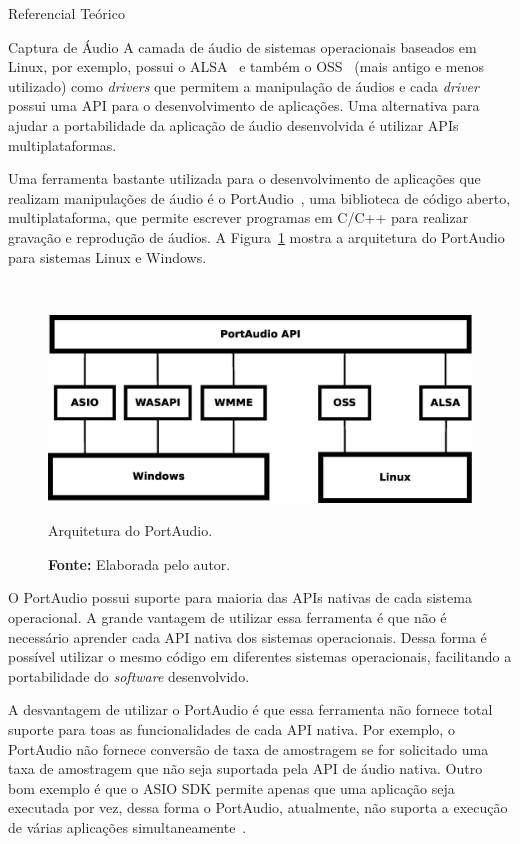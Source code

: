 \begin{chapter}{Referencial Teórico}
\begin{section}{Captura de Áudio}
A camada de áudio de sistemas operacionais baseados em Linux, por
exemplo, possui o ALSA~\cite{alsa} e também o OSS~\cite{oss} (mais antigo e
menos utilizado) como
\textit{drivers} que permitem a manipulação de áudios e cada \textit{driver}
possui uma API para o desenvolvimento de aplicações. Uma alternativa para ajudar
a portabilidade da aplicação de áudio desenvolvida é utilizar APIs
multiplataformas.

Uma ferramenta bastante utilizada para o desenvolvimento de aplicações que
realizam manipulações de áudio é o PortAudio~\cite{portaudio}, uma biblioteca de
código aberto, multiplataforma, que permite escrever programas em C/C++ para
realizar gravação e reprodução de áudios. A Figura~\ref{fig:portaudio} mostra a
arquitetura do PortAudio para sistemas Linux e Windows.

~

\begin{figure}[!h]
	\centering
	\begin{minipage}[c]{\textwidth}
	\centering
	\includegraphics[width=0.75\linewidth]{fig/portaudio}
	\caption{Arquitetura do PortAudio.}
	\vspace{-1cm}
	\caption*{\textbf{Fonte: }Elaborada pelo autor.}
	\label{fig:portaudio}
	\end{minipage}
\end{figure} 

O PortAudio possui suporte para maioria das APIs nativas de cada sistema
operacional. A grande vantagem de utilizar essa ferramenta é que não é
necessário aprender cada API nativa dos sistemas operacionais. Dessa forma é
possível utilizar o mesmo código em diferentes sistemas operacionais,
facilitando a portabilidade do \textit{software} desenvolvido.

A desvantagem de utilizar o PortAudio é que essa ferramenta não fornece total
suporte para toas as funcionalidades de cada API nativa. Por exemplo, o PortAudio não
fornece conversão de taxa de amostragem se for solicitado uma taxa de amostragem
que não seja suportada pela API de áudio nativa. Outro bom exemplo é que o ASIO
SDK permite apenas que uma aplicação seja executada por vez, dessa forma o
PortAudio, atualmente, não suporta a execução de várias aplicações
simultaneamente~\cite{portaudio}.


\end{section}
\end{chapter}
